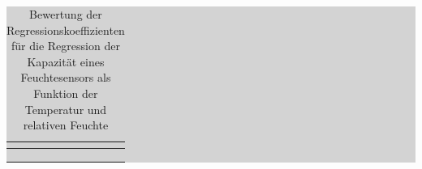 \begin{table}[H]
\setlength{\arrayrulewidth}{.1em}
\caption{Bewertung der Regressionskoeffizienten für die Regression der Kapazit\"{a}t eines Feuchtesensors als Funktion der Temperatur und relativen Feuchte}
\setlength{\fboxsep}{0pt}%
\colorbox{lightgray}{%
%
\begin{tabular}{| c | c | c | c | c |}
\hline
\parbox[c][0.7in][c]{1.18in}{\smallskip\centering\textbf{\selectfont{Name}}} & 
\parbox[c][0.7in][c]{1.18in}{\smallskip\centering\textbf{\selectfont{physikalische \\
Größe}}} & 
\parbox[c][0.7in][c]{1.18in}{\smallskip\centering\textbf{}} & 
\parbox[c][0.7in][c]{1.18in}{\smallskip\centering\textbf{}} & 
\parbox[c][0.7in][c]{1.18in}{\smallskip\centering\textbf{\selectfont{p-Wert}}} \\ \hline

\parbox[c][0.3in][c]{1.18in}{} &
\parbox[c][0.3in][c]{1.18in}{} &
\parbox[c][0.3in][c]{1.18in}{} &
\parbox[c][0.3in][c]{1.18in}{} &
\parbox[c][0.3in][c]{1.18in}{} \\ \hline

\parbox[c][0.3in][c]{1.18in}{} &
\parbox[c][0.3in][c]{1.18in}{} &
\parbox[c][0.3in][c]{1.18in}{} &
\parbox[c][0.3in][c]{1.18in}{} &
\parbox[c][0.3in][c]{1.18in}{} \\ \hline

\parbox[c][0.3in][c]{1.18in}{} &
\parbox[c][0.3in][c]{1.18in}{} &
\parbox[c][0.3in][c]{1.18in}{} &
\parbox[c][0.3in][c]{1.18in}{} &
\parbox[c][0.3in][c]{1.18in}{} \\ \hline


\end{tabular}}
\end{table}
